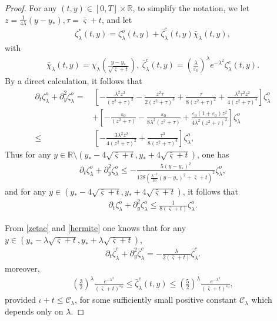 \documentclass{amsart}
\numberwithin{equation}{section}
\begin{document}
\begin{proof}
For any  $(t,y)\in[0,T]\times\mathbb{R}$, to simplify the notation, we let $z=\frac{1}{4\lambda}(y-y_{*}), \tau=\bar{\varsigma}+t$, and let
\begin{align*}
\zeta_{\lambda}^{*}(t,y)
= \zeta_{\lambda}^{o}(t,y)
 +\bar{\zeta}_{\lambda}^{c}(t,y)\bar{\chi}_{\lambda}(t,y),
\end{align*}
with
\begin{align*}
\bar{\chi}_{\lambda}(t,y)=\chi_{\lambda}\left(\frac{y-y_{*}}{\sqrt{\bar{\varsigma}+t}}\right),~
\bar{\zeta}_{\lambda}^{c}(t,y)=\left(\frac{\lambda}{\varepsilon_{0}}\right)^{\lambda}e^{-\lambda^{2}}\zeta_{\lambda}^{c}(t,y).
\end{align*}
By a direct calculation, it follows that
\begin{align*}
\partial_{t}\zeta_{\lambda}^{o}+\partial_{y}^{2}\zeta_{\lambda}^{o}
=&~\left[-\frac{\lambda^{2} z^{2}}{(z^{2}+\tau)^{2}}-\frac{z^{2}\tau}{2(z^{2}+\tau)^{3}}
         +\frac{\tau}{8(z^{2}+\tau)^{2}}+\frac{\lambda^{2}\tau^{2}z^{2}}{4(z^{2}+\tau)^{4}}\right]\zeta_{\lambda}^{o}\\
 &+\left[-\frac{\varepsilon_{0}}{(z^{2}+\tau)}-\frac{\varepsilon_{0}}{8\lambda^{2}(z^{2}+\tau)}
         +\frac{\varepsilon_{0}(1+\varepsilon_{0})z^{2}}{4\lambda^{2}(z^{2}+\tau)^{2}}\right]\zeta_{\lambda}^{o}\\
\leq&~\left[-\frac{3\lambda^{2} z^{2}}{4(z^{2}+\tau)^{2}}+\frac{\tau^{3}}{8(z^{2}+\tau)^{4}}\right]\zeta_{\lambda}^{o},
\end{align*}
Thus for any $y\in\mathbb{R}\setminus(y_{*}-4\sqrt{\bar{\varsigma}+t},y_{*}+4\sqrt{\bar{\varsigma}+t})$, one has
\begin{align}\label{zetaoe-o-0}
\partial_{t}\zeta_{\lambda}^{o}+\partial_{y}^{2}\zeta_{\lambda}^{o}
\leq -\frac{5(y-y_{*})^{2}}{128(\frac{\lambda^{-2}}{16}(y-y_{*})^{2}+\bar{\varsigma}+t)^{2}}\zeta_{\lambda}^{o},
\end{align}
and for any $y\in\left(y_{*}-4\sqrt{\bar{\varsigma}+t},y_{*}+4\sqrt{\bar{\varsigma}+t}\right)$, it follows that
\begin{align}\label{zetaoe-i}
\partial_{t}\zeta_{\lambda}^{o}+\partial_{y}^{2}\zeta_{\lambda}^{o}
\leq \frac{1}{8(\bar{\varsigma}+t)}\zeta_{\lambda}^{o}.
\end{align}

From \eqref{zetae} and \eqref{hermite} one knows that for any $y\in(y_{*}-\lambda\sqrt{\bar{\varsigma}+t},y_{*}+\lambda\sqrt{\bar{\varsigma}+t})$,
\begin{align}\label{zetace}
\partial_{t}\bar{\zeta}_{\lambda}^{c}+\partial_{y}^{2}\bar{\zeta}_{\lambda}^{c}
=-\frac{\lambda}{2(\bar{\varsigma}+t)}\bar{\zeta}_{\lambda}^{c}.
\end{align}
moreover,
\begin{align}\label{zetacb}
\left(\frac{3}{2}\right)^{\lambda}\frac{e^{-\lambda^{2}}}{{(\bar{\varsigma}+t)^{\varepsilon_{0}}}}
\leq \bar{\zeta}_{\lambda}^{c}(t,y)\leq
\left(\frac{5}{2}\right)^{\lambda}\frac{e^{-\lambda^{2}}}{{(\bar{\varsigma}+t)^{\varepsilon_{0}}}},
\end{align}
provided $\iota+t\leq \mathcal{C}_{\lambda}$, for some sufficiently small positive constant $\mathcal{C}_{\lambda}$ which depends only on $\lambda$.


\end{proof}
\end{document}
